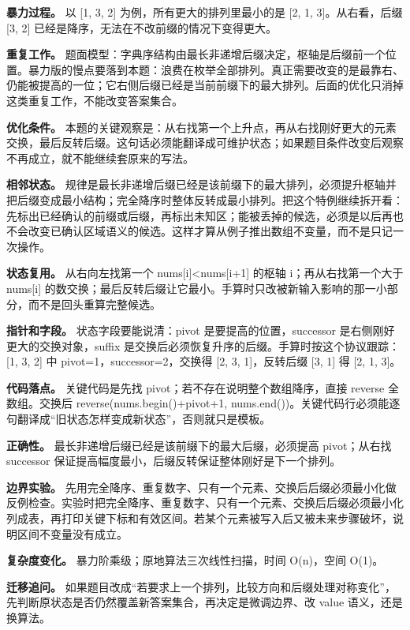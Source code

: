\textbf{暴力过程。} 以 [1, 3, 2] 为例，所有更大的排列里最小的是 [2, 1, 3]。从右看，后缀 [3, 2] 已经是降序，无法在不改前缀的情况下变得更大。

\textbf{重复工作。} 题面模型：字典序结构由最长非递增后缀决定，枢轴是后缀前一个位置。暴力版的慢点要落到本题：浪费在枚举全部排列。真正需要改变的是最靠右、仍能被提高的一位；它右侧后缀已经是当前前缀下的最大排列。后面的优化只消掉这类重复工作，不能改变答案集合。

\textbf{优化条件。} 本题的关键观察是：从右找第一个上升点，再从右找刚好更大的元素交换，最后反转后缀。这句话必须能翻译成可维护状态；如果题目条件改变后观察不再成立，就不能继续套原来的写法。

\textbf{相邻状态。} 规律是最长非递增后缀已经是该前缀下的最大排列，必须提升枢轴并把后缀变成最小结构；完全降序时整体反转成最小排列。把这个特例继续拆开看：先标出已经确认的前缀或后缀，再标出未知区；能被丢掉的候选，必须是以后再也不会改变已确认区域语义的候选。这样才算从例子推出数组不变量，而不是只记一次操作。

\textbf{状态复用。} 从右向左找第一个 nums[i]<nums[i+1] 的枢轴 i；再从右找第一个大于 nums[i] 的数交换；最后反转后缀让它最小。手算时只改被新输入影响的那一小部分，而不是回头重算完整候选。

\textbf{指针和字段。} 状态字段要能说清：pivot 是要提高的位置，successor 是右侧刚好更大的交换对象，suffix 是交换后必须恢复升序的后缀。手算时按这个协议跟踪：[1, 3, 2] 中 pivot=1，successor=2，交换得 [2, 3, 1]，反转后缀 [3, 1] 得 [2, 1, 3]。

\textbf{代码落点。} 关键代码是先找 pivot；若不存在说明整个数组降序，直接 reverse 全数组。交换后 reverse(nums.begin()+pivot+1, nums.end())。关键代码行必须能逐句翻译成“旧状态怎样变成新状态”，否则就只是模板。

\textbf{正确性。} 最长非递增后缀已经是该前缀下的最大后缀，必须提高 pivot；从右找 successor 保证提高幅度最小，后缀反转保证整体刚好是下一个排列。

\textbf{边界实验。} 先用完全降序、重复数字、只有一个元素、交换后后缀必须最小化做反例检查。实验时把完全降序、重复数字、只有一个元素、交换后后缀必须最小化列成表，再打印关键下标和有效区间。若某个元素被写入后又被未来步骤破坏，说明区间不变量没有成立。

\textbf{复杂度变化。} 暴力阶乘级；原地算法三次线性扫描，时间 O(n)，空间 O(1)。

\textbf{迁移追问。} 如果题目改成“若要求上一个排列，比较方向和后缀处理对称变化”，先判断原状态是否仍然覆盖新答案集合，再决定是微调边界、改 value 语义，还是换算法。

